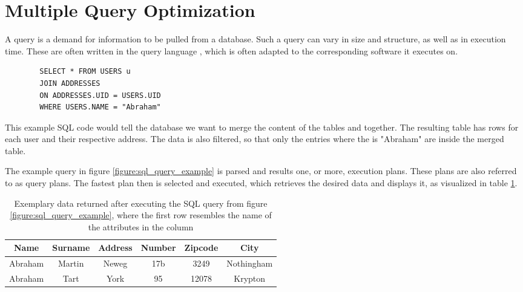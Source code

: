 
\newpage

\section{Multiple Query Optimization}
\label{chapter:fundamental_multiple_query_optimization}

A query\cite{codd_relational_1970} is a demand for information to be pulled from a database. Such a query can vary in size and structure, as well as in execution time. These are often written in the query language , which is often adapted to the corresponding software\cite{shirgoldbird_microsoft_nodate}\cite{the_postgresql_global_development_group_postgresql_2022} it executes on. 

    
\begin{listing}[!ht]
    \centering
    \begin{verbatim}
        SELECT * FROM USERS u
        JOIN ADDRESSES
        ON ADDRESSES.UID = USERS.UID
        WHERE USERS.NAME = "Abraham"
    \end{verbatim}
    \caption{This example SQL code would tell the database we want to merge the content of the tables  and  together. The resulting table has rows for each user and their respective address. The data is also filtered, so that only the entries where the  is "Abraham" are inside the merged table.}
    \label{figure:sql_query_example}
\end{listing}

The example query in figure \ref{figure:sql_query_example} is parsed and results one, or more, execution plans\cite{microsoft_execution_nodate}. These plans are also referred to as query plans. The fastest plan then is selected and executed, which retrieves the desired data and displays it, as visualized in table \ref{table:sql_query_result_example}.

\begin{table}[!h]
    \centering
    \begin{tabular}{|c|c|c|c|c|c|}
        \hline
        Name    & Surname  & Address & Number & Zipcode & City\\ \hline
        Abraham & Martin   & Neweg & 17b & 3249 & Nothingham \\ \hline
        Abraham & Tart     & York & 95 & 12078 & Krypton    \\ \hline
    \end{tabular}
    \caption{Exemplary data returned after executing the SQL query from figure \ref{figure:sql_query_example}, where the first row resembles the name of the attributes in the column}
    \label{table:sql_query_result_example}
\end{table}

